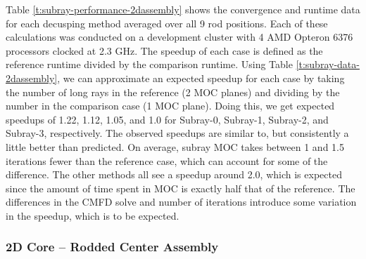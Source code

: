 Table \ref{t:subray-performance-2dassembly} shows the convergence and runtime data for each decusping method averaged over all 9 rod positions.  Each of these calculations was conducted on a development cluster with 4 AMD Opteron\texttrademark{} 6376 processors clocked at 2.3 GHz. The speedup of each case is defined as the reference runtime divided by the comparison runtime.  Using Table \ref{t:subray-data-2dassembly}, we can approximate an expected speedup for each case by taking the number of long rays in the reference (2 MOC planes) and dividing by the number in the comparison case (1 MOC plane).  Doing this, we get expected speedups of 1.22, 1.12, 1.05, and 1.0 for Subray-0, Subray-1, Subray-2, and Subray-3, respectively.  The observed speedups are similar to, but consistently a little better than predicted.  On average, subray MOC takes between 1 and 1.5 iterations fewer than the reference case, which can account for some of the difference.  The other methods all see a speedup around 2.0, which is expected since the amount of time spent in MOC is exactly half that of the reference.  The differences in the CMFD solve and number of iterations introduce some variation in the speedup, which is to be expected.

\subsubsection{2D Core -- Rodded Center Assembly}

